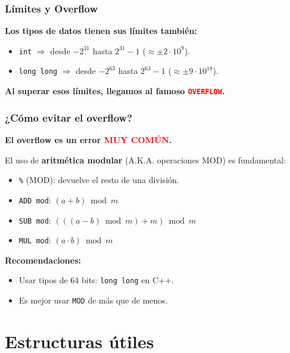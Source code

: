 \documentclass{beamer}
\begin{document}
\begin{frame}
  \frametitle{Límites y Overflow}

  \textbf{Los tipos de datos tienen sus límites también:}

  \begin{itemize}
    \item \texttt{int} $\Rightarrow$ desde $-2^{31}$ hasta $2^{31}-1$ ($\approx \pm 2 \cdot 10^{9}$).
    \item \texttt{long long} $\Rightarrow$ desde $-2^{63}$ hasta $2^{63}-1$ ($\approx \pm 9 \cdot 10^{18}$).
  \end{itemize}

  \vspace{0.3cm}
  \textbf{Al superar esos límites, llegamos al famoso \textcolor{red}{\texttt{OVERFLOW}}.}

\end{frame}


\begin{frame}
  \frametitle{¿Cómo evitar el overflow?}

  \textbf{El overflow es un error \textcolor{red}{MUY COMÚN}.}

  \vspace{0.2cm}
  El uso de \textbf{aritmética modular} (A.K.A. operaciones MOD) es fundamental:  

  \begin{itemize}
    \item \texttt{\%} (MOD): devuelve el resto de una división.
    \item \texttt{ADD mod}: $(a + b) \bmod m$
    \item \texttt{SUB mod}: $(((a - b) \bmod m) + m ) \bmod m$
    \item \texttt{MUL mod}: $(a \cdot b) \bmod m$
  \end{itemize}

  \vspace{0.2cm}
  \textbf{Recomendaciones:}
  \begin{itemize}
    \item Usar tipos de 64 bits: \texttt{long long} en C++.
    \item Es mejor usar \texttt{MOD} de más que de menos.
  \end{itemize}

\end{frame}



\section{Estructuras útiles}
\end{document}

